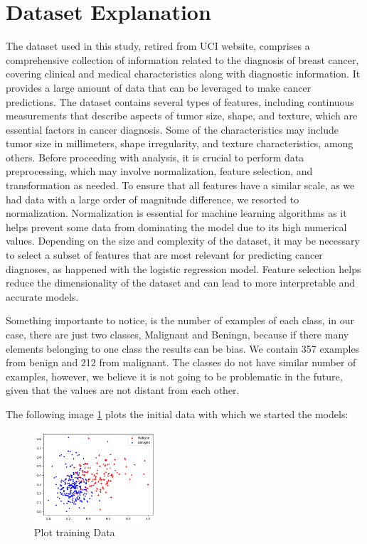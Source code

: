 \documentclass[12pt,a4paper,twocolumn]{article}
\begin{document}
\section{Dataset Explanation}
The dataset used in this study, retired from UCI website\cite{misc_breast_cancer}, comprises a comprehensive collection of information related to the diagnosis of breast cancer, covering clinical and medical characteristics along with diagnostic information. It provides a large amount of data that can be leveraged to make cancer predictions. The dataset contains several types of features, including continuous measurements that describe aspects of tumor size, shape, and texture, which are essential factors in cancer diagnosis. Some of the characteristics may include tumor size in millimeters, shape irregularity, and texture characteristics, among others. Before proceeding with analysis, it is crucial to perform data preprocessing, which may involve normalization, feature selection, and transformation as needed.
To ensure that all features have a similar scale, as we had data with a large order of magnitude difference, we resorted to normalization. Normalization is essential for machine learning algorithms as it helps prevent some data from dominating the model due to its high numerical values.
Depending on the size and complexity of the dataset, it may be necessary to select a subset of features that are most relevant for predicting cancer diagnoses, as happened with the logistic regression model. Feature selection helps reduce the dimensionality of the dataset and can lead to more interpretable and accurate models.
\par Something importante to notice, is the number of examples of each class, in our case, there are just two classes, Malignant and Beningn, because if there many elements belonging to one class the results can be bias. We contain 357 examples from benign and 212 from malignant. The classes do not have similar number of examples, however, we believe it is not going to be problematic in the future, given that the values are not distant from each other.
\par The following image \ref{fig:plot_data} plots the initial data with which we started the models:
\begin{figure}[H]

\includegraphics[width=0.4\textwidth]{images/output.png}
\centering
\caption{\label{fig:plot_data} Plot training Data}
\end{figure}
\end{document}
